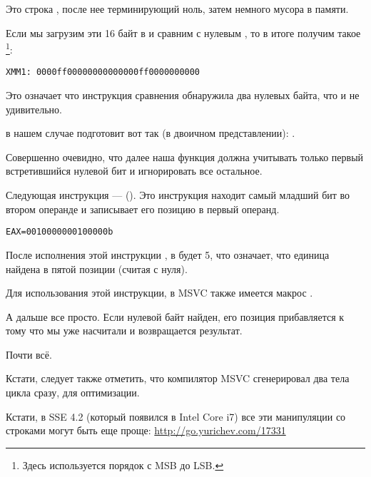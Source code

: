 Это строка , после нее терминирующий ноль, затем немного мусора в памяти.

Если мы загрузим эти 16 байт в  и сравним с нулевым , то в итоге получим такое 
\footnote{Здесь используется порядок с \ac{MSB} до \ac{LSB}.}:

\begin{verbatim}
XMM1: 0000ff00000000000000ff0000000000
\end{verbatim}

Это означает что инструкция сравнения обнаружила два нулевых байта, что и не удивительно.

 в нашем случае подготовит \EAX вот так (в двоичном представлении): .

Совершенно очевидно, что далее наша функция должна учитывать только первый встретившийся
нулевой бит и игнорировать все остальное.

\label{instruction_BSF}
Следующая инструкция ---  (). 
Это инструкция находит самый младший бит во втором операнде и записывает его позицию в первый операнд.

\begin{verbatim}
EAX=0010000000100000b
\end{verbatim}

После исполнения этой инструкции , в \EAX будет 5, что означает, 
что единица найдена в пятой позиции (считая с нуля).

Для использования этой инструкции, в MSVC также имеется макрос .

А дальше все просто. Если нулевой байт найден, его позиция прибавляется к тому что 
мы уже насчитали и возвращается результат.

Почти всё.

Кстати, следует также отметить, что компилятор MSVC сгенерировал два тела цикла сразу, для оптимизации.

Кстати, в SSE 4.2 (который появился в Intel Core i7) все эти манипуляции со строками могут быть еще проще:
 \url{http://go.yurichev.com/17331}
